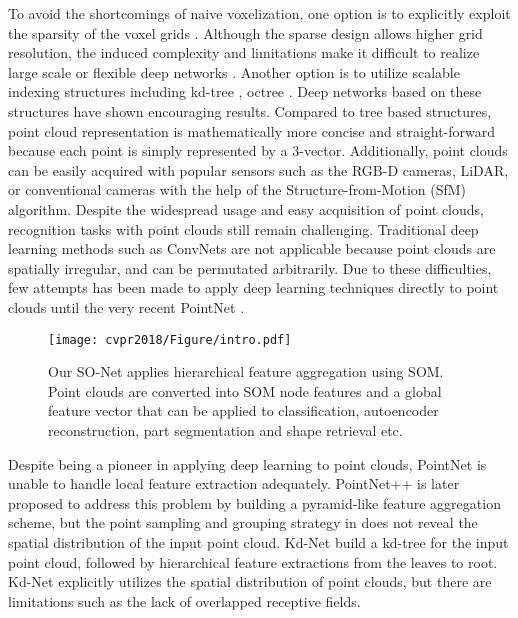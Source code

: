\documentclass[10pt,twocolumn,letterpaper]{article}
\begin{document}
To avoid the shortcomings of naive voxelization, one option is to explicitly exploit the sparsity of the voxel grids \cite{wang2015voting, li2016fpnn, engelcke2017vote3deep}. Although the sparse design allows higher grid resolution, the induced complexity and limitations make it difficult to realize large scale or flexible deep networks \cite{Riegler2017OctNet}. Another option is to utilize scalable indexing structures including kd-tree \cite{bentley1975multidimensional}, octree \cite{meagher1980octree}. Deep networks based on these structures have shown encouraging results. Compared to tree based structures, point cloud representation is mathematically more concise and straight-forward because each point is simply represented by a 3-vector. Additionally, point clouds can be easily acquired with popular sensors such as the RGB-D cameras, LiDAR, or conventional cameras with the help of the Structure-from-Motion (SfM) algorithm. Despite the widespread usage and easy acquisition of point clouds, recognition tasks with point clouds still remain challenging. Traditional deep learning methods such as ConvNets are not applicable because point clouds are spatially irregular, and can be permutated arbitrarily. Due to these difficulties, few attempts has been made to apply deep learning techniques directly to point clouds until the very recent PointNet \cite{qi2016pointnet}. 

\begin{figure}[t] \centering
\texttt{[image: cvpr2018/Figure/intro.pdf]}
\caption{Our SO-Net applies hierarchical feature aggregation using SOM. Point clouds are converted into SOM node features and a global feature vector that can be applied to classification, autoencoder reconstruction, part segmentation and shape retrieval etc. 
} \label{fig_intro}
\vspace{-4pt}
\end{figure}

Despite being a pioneer in applying deep learning to point clouds, PointNet is unable to handle local feature extraction adequately. PointNet++ \cite{qi2017pointnet++} is later proposed to address this problem by building a pyramid-like feature aggregation scheme, but the point sampling and grouping strategy in \cite{qi2017pointnet++} does not reveal the spatial distribution of the input point cloud. Kd-Net \cite{klokov2017escape} build a kd-tree for the input point cloud, followed by hierarchical feature extractions from the leaves to root. Kd-Net explicitly utilizes the spatial distribution of point clouds, but there are limitations such as the lack of overlapped receptive fields.
\end{document}
